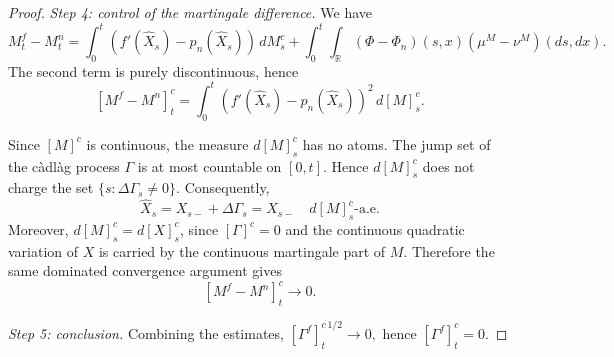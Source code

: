 \documentclass[a4paper,10pt]{article}
\begin{document}
\begin{proof}
\medskip

\textit{Step 4: control of the martingale difference.}
We have
\[
M^f_t-M^n_t
=
\int_0^t (f'(\widehat X_s)-p_n(\widehat X_s))\,dM^c_s
+
\int_0^t\int_{\mathbb R}
(\Phi-\Phi_n)(s,x)(\mu^M-\nu^M)(ds,dx).
\]
The second term is purely discontinuous, hence
\[
[M^f-M^n]^c_t
=
\int_0^t
(f'(\widehat X_s)-p_n(\widehat X_s))^2\,d[M]^c_s.
\]

Since \([M]^c\) is continuous, the measure \(d[M]^c_s\) has no atoms.
The jump set of the càdlàg process \(\Gamma\) is at most countable on
\([0,t]\). Hence \(d[M]^c_s\) does not charge the set
\(\{s:\Delta\Gamma_s\ne0\}\). Consequently,
\[
        \widehat X_s=X_{s-}+\Delta\Gamma_s=X_{s-}
        \quad d[M]^c_s\text{-a.e.}
\]
Moreover, \(d[M]^c_s=d[X]^c_s\), since \([\Gamma]^c=0\) and the
continuous quadratic variation of \(X\) is carried by the continuous
martingale part of \(M\). Therefore the same dominated convergence
argument gives
\[
        [M^f-M^n]^c_t \longrightarrow 0.
\]

\medskip

\textit{Step 5: conclusion.}
Combining the estimates,
$
[\Gamma^f]_t^{c\,1/2}\to0,
$
hence
$
        [\Gamma^f]^c_t=0.
$
\end{proof}
\end{document}
